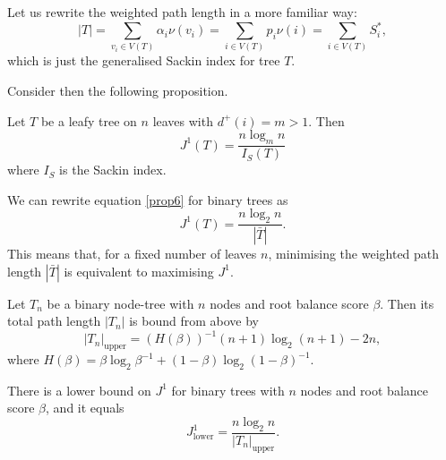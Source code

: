 \begin{remark}
    Let us rewrite the weighted path length in a more familiar way:
    \begin{equation*}
        |T| = \sum_{v_i \in V(T)} \alpha_i \nu(v_i) = \sum_{i \in V(T)} p_i \nu(i) = \sum_{i\in V(T)} S^*_i,
    \end{equation*}
    which is just the generalised Sackin index for tree $T$. 
\end{remark}
Consider then the following proposition.
\begin{proposition}
    Let $T$ be a leafy tree on $n$ leaves with $d^+(i) = m > 1$. Then
    \begin{equation}
        J^1(T) = \frac{n\log_mn}{I_S(T)} \label{prop6}
    \end{equation}
    where $I_S$ is the Sackin index.
\end{proposition}
\begin{corollary}
    We can rewrite equation \eqref{prop6} for binary trees as 
    \begin{equation}
        J^1(T) = \frac{n\log_2n}{|\bar{T}|}. \label{corr6}
    \end{equation}
    This means that, for a fixed number of leaves $n$, minimising the weighted path length $|\bar T|$ is equivalent to maximising $J^1$. 
\end{corollary}

\begin{theorem}
    Let $T_n$ be a binary node-tree with $n$ nodes and root balance score $\beta$. Then its total path length $|T_n|$ is bound from above by
    \begin{equation}\label{path_upper_bound}
        |T_n|_\text{upper} = (H(\beta))^{-1}(n+1)\log_2(n+1)-2n,
    \end{equation}
    where $H(\beta) = \beta\log_2\beta^{-1}+(1-\beta)\log_2(1-\beta)^{-1}$.
\end{theorem}

\begin{corollary}\label{j1_lower_bound_cor}
    There is a lower bound on $J^1$ for binary trees with $n$ nodes and root balance score $\beta$, and it equals
    \begin{equation}\label{j1_lower_bound}
        J^1_\text{lower} = \frac{n\log_2n}{|T_n|_\text{upper}}.
    \end{equation}
\end{corollary}

